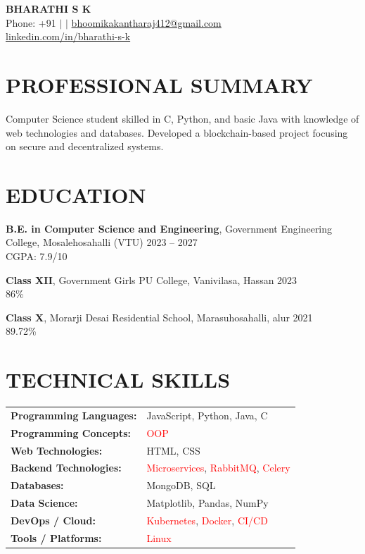 \documentclass[9.5pt,a4paper]{extarticle}
\begin{document}
\begin{center}
{\Large \textbf{BHARATHI S K}} \\ \vspace{2pt}
Phone: +91 \quad $|$  \quad $|$ \quad \href{mailto:bhoomikakantharaj412@gmail.com}{bhoomikakantharaj412@gmail.com} \\
\href{https://linkedin.com/in/bharathi-s-k}{linkedin.com/in/bharathi-s-k}
\end{center}

\section*{PROFESSIONAL SUMMARY}
Computer Science student skilled in C, Python, and basic Java with knowledge of web technologies and databases. Developed a blockchain-based project focusing on secure and decentralized systems.

\section*{EDUCATION}
\noindent \textbf{B.E. in Computer Science and Engineering}, Government Engineering College, Mosalehosahalli (VTU) \hfill 2023 – 2027 \\
\null \hfill CGPA: 7.9/10 \vspace{4pt}

\noindent \textbf{Class XII}, Government Girls PU College, Vanivilasa, Hassan \hfill 2023 \\
\null \hfill 86\% \vspace{4pt}

\noindent \textbf{Class X}, Morarji Desai Residential School, Marasuhosahalli, alur \hfill 2021 \\
\null \hfill 89.72\% \vspace{4pt}


\section*{TECHNICAL SKILLS}
\begin{tabular}{@{}p{2.3in}p{4.6in}@{}}
\textbf{Programming Languages:} & JavaScript, Python, Java, C \\
\textbf{Programming Concepts:} & \textcolor{red}{OOP} \\
\textbf{Web Technologies:} & HTML, CSS \\
\textbf{Backend Technologies:} & \textcolor{red}{Microservices}, \textcolor{red}{RabbitMQ}, \textcolor{red}{Celery} \\
\textbf{Databases:} & MongoDB, SQL \\
\textbf{Data Science:} & Matplotlib, Pandas, NumPy \\
\textbf{DevOps / Cloud:} & \textcolor{red}{Kubernetes}, \textcolor{red}{Docker}, \textcolor{red}{CI/CD} \\
\textbf{Tools / Platforms:} & \textcolor{red}{Linux} \\
\end{tabular}
\end{document}
